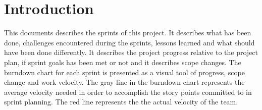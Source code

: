 \section{Introduction}
This documents describes the sprints of this project. It describes what has been done, challenges encountered during the sprints, lessons learned and what should have been done differently. It describes the project progress relative to the project plan, if sprint goals has been met or not and it describes scope changes.\newline \newline
The burndown chart for each sprint is presented as a visual tool of progress, scope change and work velocity. The gray line in the burndown chart represents the average velocity needed in order to accomplish the story points committed to in sprint planning. The red line represents the the actual velocity of the team.
